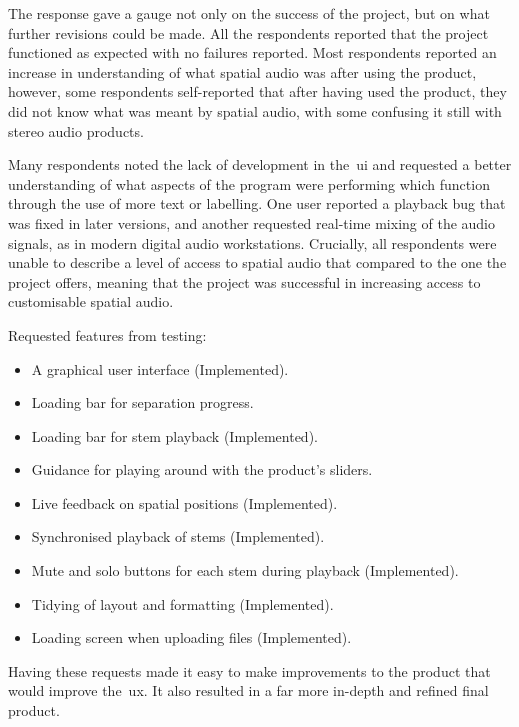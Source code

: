 The response gave a gauge not only on the success of the project, but on what further revisions could be made.
All the respondents reported that the project functioned as expected with no failures reported.
Most respondents reported an increase in understanding of what spatial audio was after using the product,
however, some respondents self-reported that after having used the product,
they did not know what was meant by spatial audio, with some confusing it still with stereo audio products.

Many respondents noted
the lack of development in the~\gls{ui} and requested a better understanding
of what aspects of the program were performing which function through the use of more text or labelling.
One user reported a playback bug that was fixed in later versions,
and another requested real-time mixing of the audio signals, as in modern digital audio workstations.
Crucially,
all respondents were unable
to describe a level of access to spatial audio that compared to the one the project offers,
meaning that the project was successful in increasing access to customisable spatial audio.

Requested features from testing:

\begin{itemize}
    \item A graphical user interface (Implemented).
    \item Loading bar for separation progress.
    \item Loading bar for stem playback (Implemented).
    \item Guidance for playing around with the product's sliders.
    \item Live feedback on spatial positions (Implemented).
    \item Synchronised playback of stems (Implemented).
    \item Mute and solo buttons for each stem during playback (Implemented).
    \item Tidying of layout and formatting (Implemented).
    \item Loading screen when uploading files (Implemented).
\end{itemize}

Having these requests made it easy to make improvements to the product that would improve the~\gls{ux}.
It also resulted in a far more in-depth and refined final product.
